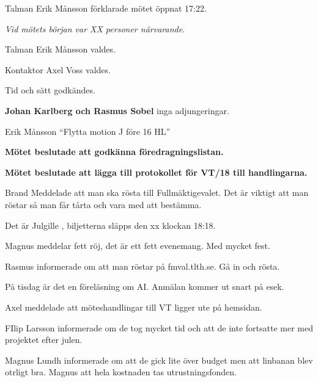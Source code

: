 \documentclass[10pt]{article}
\def\mo{Erik Månsson}
\def\ms{Axel Voss}
\begin{document}
\begin{paragrafer}

Talman {\mo} förklarade mötet öppnat 17:22.

\emph{Vid mötets början var XX personer närvarande.}

Talman {\mo} valdes.

Kontaktor {\ms} valdes.

Tid och sätt godkändes.



\textbf{Johan Karlberg och Rasmus Sobel}
inga adjungeringar.


Erik Månsson \ypa ``Flytta motion J före 16 HL''

\Mba

\textbf{Mötet beslutade att godkänna föredragningslistan.}

\textbf{Mötet beslutade att lägga till protokollet för VT/18 till handlingarna.}


Brand Meddelade att man ska rösta till Fullmäktigevalet. Det är viktigt att man röstar så man får tårta och vara med att bestämma.

Det är Julgille , biljetterna släpps den xx klockan 18:18.

Magnus meddelar fett röj, det är ett fett evenemang. Med mycket fest. 

Rasmus informerade om att man röstar på fmval.tlth.se. Gå in och rösta.

På tisdag är det en föreläsning om AI. Anmälan kommer ut snart på esek.

Axel meddelade att möteshandlingar till VT ligger ute på hemsidan.


FIlip Larsson informerade om de tog mycket tid och att de inte fortsatte mer med projektet efter julen.

\Mba

Magnus Lundh informerade om att de gick lite över budget men att linbanan blev otrligt bra. Magnus \ypa att hela kostnaden tas utrustningsfonden.


\end{paragrafer}
\end{document}
